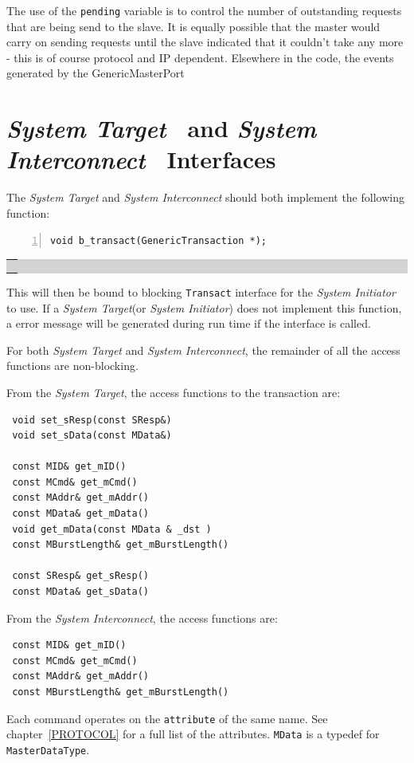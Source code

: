 \documentclass[12pt,oneside]{gsbook}
\newcommand{\master}{{\em System Initiator}\xspace}
\newcommand{\slave}{{\em System Target}\xspace}
\newcommand{\router}{{\em System Interconnect}\xspace}
\def\example#1{\begin{center}\colorbox{lightgrey}{\begin{tabular}{|p{0.6\paperwidth}|}\hline\\#1\\ \\ \hline\end{tabular}}\end{center}}
\newenvironment{exampleenv}{\begin{lrbox}{\examplebox}\begin{minipage}{0.6\paperwidth}}{\end{minipage}\end{lrbox}\example{\usebox{\examplebox}}}
\begin{document}
The use of the {\tt pending} variable is to control the number of
outstanding requests that are being send to the slave. It is equally
possible that the master would carry on sending requests until the
slave indicated that it couldn't take any more - this is of course
protocol and IP dependent. Elsewhere in the code, the events generated
by the GenericMasterPort


\section{\slave ~ and \router ~ Interfaces}  

The \slave and \router should both implement the following function:
\begin{exampleenv}
\begin{Verbatim}[numbers=left,fontsize=\small]
void b_transact(GenericTransaction *);
\end{Verbatim}
\end{exampleenv}

This will then be bound to blocking {\tt Transact} interface for the
\master to use. If a \slave (or \master) does not implement this
function, a error message will be generated during run time if the
interface is called.

For both \slave and \router, the remainder of all the access functions
are non-blocking.

From the \slave, the access functions to the transaction are:

\begin{verbatim}
 void set_sResp(const SResp&) 
 void set_sData(const MData&)

 const MID& get_mID()
 const MCmd& get_mCmd()
 const MAddr& get_mAddr()
 const MData& get_mData()
 void get_mData(const MData & _dst )
 const MBurstLength& get_mBurstLength()

 const SResp& get_sResp()
 const MData& get_sData()
\end{verbatim}


From the \router, the access functions are:
\begin{verbatim}
 const MID& get_mID()
 const MCmd& get_mCmd()
 const MAddr& get_mAddr()
 const MBurstLength& get_mBurstLength()
\end{verbatim}


Each command operates on the {\tt attribute} of the same name. See
chapter~\ref{PROTOCOL} for a full list of the attributes.  {\tt MData}
is a typedef for {\tt MasterDataType}.
\end{document}
